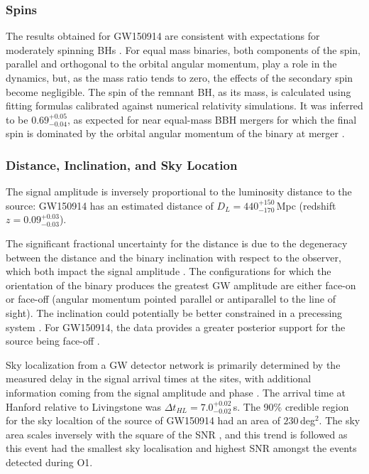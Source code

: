 \documentclass[binding=0.6cm, LaM]{sapthesis}
\begin{document}
	\subsubsection{Spins}
	The results obtained for GW150914 are consistent with expectations for moderately spinning BHs \cite{101, 102}. 
	For equal mass binaries, both components of the spin, 
	parallel and orthogonal to the orbital angular momentum, 
	play a role in the dynamics, but, as the mass ratio tends to zero, 
	the effects of the secondary spin become negligible.
	The spin of the remnant BH, as its mass, is calculated using fitting formulas 
	calibrated against numerical relativity simulations.  
	It was inferred to be $0.69^{+0.05}_{-0.04}$, as expected for near equal-mass BBH mergers 
	for which the final spin is dominated by the orbital angular momentum of the binary at merger \cite{99, 100}.

	\subsubsection{Distance, Inclination, and Sky Location}
	The signal amplitude is inversely proportional to the luminosity distance to the source: 
	GW150914 has an estimated distance of $D_L = 440^{+150}_{-170}\,$Mpc (redshift $z=0.09^{+0.03}_{-0.03}$). 

	The significant fractional uncertainty for the distance is due to the degeneracy 
	between the distance and the binary inclination with respect to the observer, which both impact the signal amplitude \cite{96-98}.
	The configurations for which the orientation of the binary produces the greatest GW amplitude 
	are either face-on or face-off (angular momentum pointed parallel or antiparallel to the line of sight). 
	The inclination could potentially be better constrained in a precessing system \cite{94, 95}. 
	For GW150914, the data provides a greater posterior support for the source being face-off \cite{93}.

	Sky localization from a GW detector network is primarily determined by the measured delay in the signal arrival times at the sites, 
	with additional information coming from the signal amplitude and phase \cite{91,12}. 
	The arrival time at Hanford relative to Livingstone was $\Delta t_{HL} = 7.0^{+0.02}_{-0.02}$\,s.
	The 90\% credible region for the sky localtion of the source of GW150914 had an area of $230\,$deg$^2$.
	The sky area scales inversely with the square of the SNR \cite{89,90}, 
	and this trend is followed as this event had the smallest sky localisation and 
	highest SNR amongst the events detected during O1.
\end{document}
